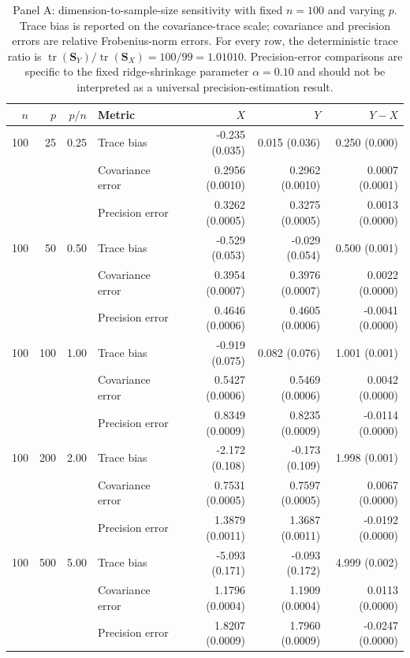 \begin{table}[htbp]
\centering
\scriptsize
\caption{Panel A: dimension-to-sample-size sensitivity with fixed $n=100$ and varying $p$. Trace bias is reported on the covariance-trace scale; covariance and precision errors are relative Frobenius-norm errors. For every row, the deterministic trace ratio is $\operatorname{tr}(\mathbf{S}_Y)/\operatorname{tr}(\mathbf{S}_X)=100/99=1.01010$. Precision-error comparisons are specific to the fixed ridge-shrinkage parameter $\alpha=0.10$ and should not be interpreted as a universal precision-estimation result.}
\label{tab:pn_sensitivity_fixed_n}
\begin{tabular}{rrrlrrr}
\hline\hline
\textbf{$n$} & \textbf{$p$} & \textbf{$p/n$} & \textbf{Metric} & \textbf{$X$} & \textbf{$Y$} & \textbf{$Y-X$} \\
\hline
100 & 25 & 0.25 & Trace bias & -0.235 (0.035) & 0.015 (0.036) & 0.250 (0.000) \\
 &  &  & Covariance error & 0.2956 (0.0010) & 0.2962 (0.0010) & 0.0007 (0.0001) \\
 &  &  & Precision error & 0.3262 (0.0005) & 0.3275 (0.0005) & 0.0013 (0.0000) \\
\hline
100 & 50 & 0.50 & Trace bias & -0.529 (0.053) & -0.029 (0.054) & 0.500 (0.001) \\
 &  &  & Covariance error & 0.3954 (0.0007) & 0.3976 (0.0007) & 0.0022 (0.0000) \\
 &  &  & Precision error & 0.4646 (0.0006) & 0.4605 (0.0006) & -0.0041 (0.0000) \\
\hline
100 & 100 & 1.00 & Trace bias & -0.919 (0.075) & 0.082 (0.076) & 1.001 (0.001) \\
 &  &  & Covariance error & 0.5427 (0.0006) & 0.5469 (0.0006) & 0.0042 (0.0000) \\
 &  &  & Precision error & 0.8349 (0.0009) & 0.8235 (0.0009) & -0.0114 (0.0000) \\
\hline
100 & 200 & 2.00 & Trace bias & -2.172 (0.108) & -0.173 (0.109) & 1.998 (0.001) \\
 &  &  & Covariance error & 0.7531 (0.0005) & 0.7597 (0.0005) & 0.0067 (0.0000) \\
 &  &  & Precision error & 1.3879 (0.0011) & 1.3687 (0.0011) & -0.0192 (0.0000) \\
\hline
100 & 500 & 5.00 & Trace bias & -5.093 (0.171) & -0.093 (0.172) & 4.999 (0.002) \\
 &  &  & Covariance error & 1.1796 (0.0004) & 1.1909 (0.0004) & 0.0113 (0.0000) \\
 &  &  & Precision error & 1.8207 (0.0009) & 1.7960 (0.0009) & -0.0247 (0.0000) \\
\hline\hline
\end{tabular}
\end{table}

